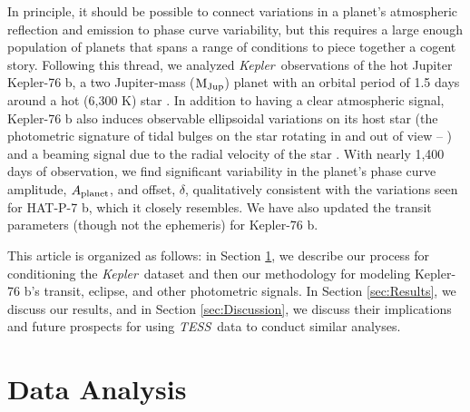 \documentclass[manuscript]{aastex62}
\newcommand{\kepler}{{\it Kepler}}
\newcommand{\tess}{{\it TESS}}
\begin{document}
In principle, it should be possible to connect variations in a planet's atmospheric reflection and emission to phase curve variability, but this requires a large enough population of planets that spans a range of conditions to piece together a cogent story. Following this thread, we analyzed \kepler\ observations of the hot Jupiter Kepler-76 b, a two Jupiter-mass (${\rm M_{Jup}}$) planet with an orbital period of 1.5 days around a hot (6,300 K) star \citep{2013ApJ...771...26F}. In addition to having a clear atmospheric signal, Kepler-76 b also induces observable ellipsoidal variations on its host star (the photometric signature of tidal bulges on the star rotating in and out of view -- \citealp{2010ApJ...713L.145W}) and a beaming signal due to the radial velocity of the star \citep{2003ApJ...588L.117L}. With nearly 1,400 days of observation, we find significant variability in the planet's phase curve amplitude, $A_{\rm planet}$, and offset, $\delta$, qualitatively consistent with the variations seen for HAT-P-7 b, which it closely resembles. We have also updated the transit parameters (though not the ephemeris) for Kepler-76 b.

This article is organized as follows: in Section \ref{sec:Data_Analysis}, we describe our process for conditioning the \kepler\ dataset and then our methodology for modeling Kepler-76 b's transit, eclipse, and other photometric signals. In Section \ref{sec:Results}, we discuss our results, and in Section \ref{sec:Discussion}, we discuss their implications and future prospects for using \tess\ data to conduct similar analyses.

\section{Data Analysis}
\label{sec:Data_Analysis}
\end{document}
